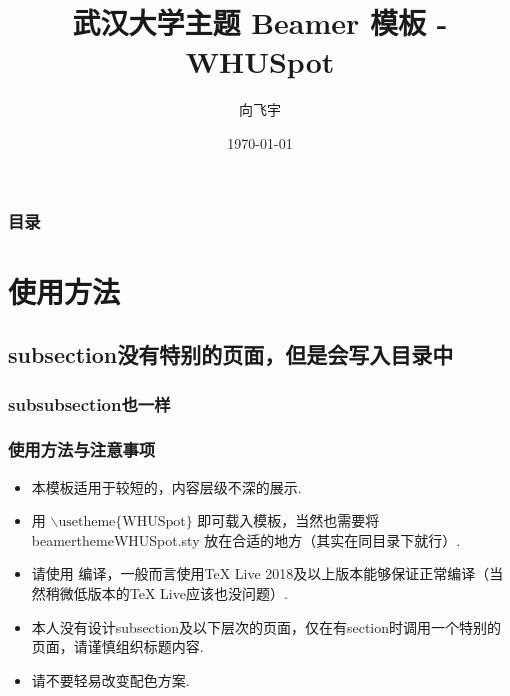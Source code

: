 \documentclass{beamer}
\title{武汉大学主题 Beamer 模板 - WHUSpot}
\author{向飞宇}
\institute{武汉大学}
\date{\today}
\begin{document}
\begin{frame}
    \titlepage
\end{frame}

\begin{frame}
	\frametitle{目录}
	\tableofcontents
\end{frame}

\section{使用方法}

\subsection{subsection没有特别的页面，但是会写入目录中}

\subsubsection{subsubsection也一样}

\begin{frame}
    \frametitle{使用方法与注意事项}
    \begin{itemize}
    	\item 本模板适用于\alert{较短的，内容层级不深的}展示.
        \item 用 $\backslash \mbox{usetheme\{WHUSpot\}}$ 即可载入模板，当然也需要将 beamerthemeWHUSpot.sty 放在合适的地方（其实在同目录下就行）.
        \item 请使用  编译，一般而言使用\alert{TeX Live 2018}及以上版本能够保证正常编译（当然稍微低版本的TeX Live应该也没问题）.
        \item 本人\alert{没有设计subsection及以下层次}的页面，仅在有section时调用一个特别的页面，请谨慎组织标题内容.
        \item 请不要轻易改变配色方案.
    \end{itemize}
\end{frame}
\end{document}
